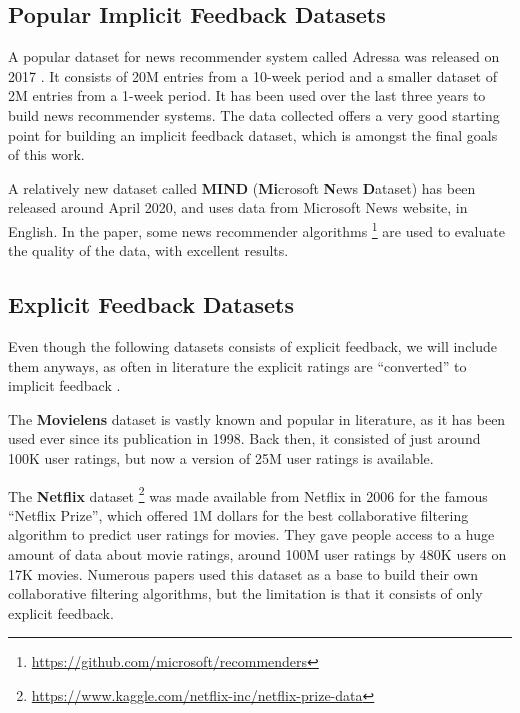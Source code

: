 \documentclass[sigconf,nonacm]{acmart}
\begin{document}
\subsection{Popular Implicit Feedback Datasets}

A popular dataset for news recommender system called Adressa was released on 2017
\cite{gulla2017adressa}. It consists of 20M entries from a 10-week period and a
smaller dataset of 2M entries from a 1-week period. It has been used over the
last three years to build news recommender systems. The data collected offers a
very good starting point for building an implicit feedback dataset, which is
amongst the final goals of this work.

A relatively new dataset called \textbf{MIND} (\textbf{Mi}crosoft \textbf{N}ews
\textbf{D}ataset) \cite{wumind} has been released around April 2020, and uses
data from Microsoft News website, in English. In the paper, some news
recommender algorithms
\footnote{\href{https://github.com/microsoft/recommenders}{https://github.com/microsoft/recommenders}}
are used to evaluate the quality of the data, with excellent results.

\subsection{Explicit Feedback Datasets}

Even though the following datasets consists of explicit feedback, we will include
them anyways, as often in literature the explicit ratings are ``converted'' to
implicit feedback \cite{feigl2018neural, manzato2013gsvd, hidasi2012fast}.

The \textbf{Movielens} dataset is vastly known and popular in literature, as it has been
used ever since its publication in 1998. Back then, it consisted of just around
100K user ratings, but now a version of 25M user ratings is available.

The \textbf{Netflix} dataset
\footnote{\href{https://www.kaggle.com/netflix-inc/netflix-prize-data}{https://www.kaggle.com/netflix-inc/netflix-prize-data}}
was made available from Netflix in 2006 for the famous ``Netflix Prize'', which
offered 1M dollars for the best collaborative filtering algorithm to predict
user ratings for movies. They gave people access to a huge amount of data about
movie ratings, around 100M user ratings by 480K users on 17K movies. Numerous
papers used this dataset as a base to build their own collaborative filtering
algorithms, but the limitation is that it consists of only explicit feedback.
\end{document}
